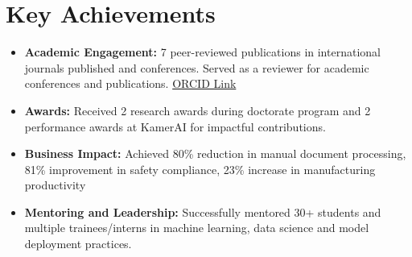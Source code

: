 \documentclass[a4paper,11pt]{article}
\begin{document}
\section{Key Achievements}
  \begin{itemize}[leftmargin=*, itemsep = -4pt]
    \item {\textbf{Academic Engagement: }7 peer-reviewed publications in international journals published and conferences. Served as a reviewer for academic conferences and publications. \href{https://orcid.org/0000-0002-2247-9046}{ORCID Link}}
    \item {\textbf{Awards: }Received 2 research awards during doctorate program and 2 performance awards at KamerAI for impactful contributions.}
    \item{\textbf{Business Impact: }Achieved 80\% reduction in manual document processing, 81\% improvement in safety compliance, 23\% increase in manufacturing productivity}
    \item {\textbf{Mentoring and Leadership: }Successfully mentored 30+ students and multiple trainees/interns in machine learning, data science and model deployment practices.}
  \end{itemize}
\end{document}
